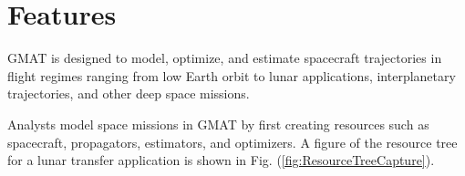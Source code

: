 
\section{Features}

%
%
%

GMAT is designed to model, optimize, and estimate spacecraft trajectories in flight regimes ranging from low Earth orbit to lunar applications, interplanetary trajectories, and other deep space missions.

Analysts model space missions in GMAT by first creating resources such as spacecraft, propagators, estimators, and optimizers.  A figure of the resource tree for a lunar transfer application is shown in Fig. (\ref{fig:ResourceTreeCapture}).
%
